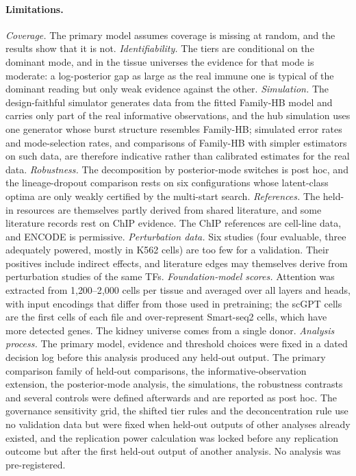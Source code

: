 \documentclass[11pt,a4paper]{article}
\begin{document}
\paragraph{Limitations.}
\emph{Coverage.} The primary model assumes coverage is missing at random, and the results show that it is not.
\emph{Identifiability.} The tiers are conditional on the dominant mode, and in the tissue universes the evidence for that mode is moderate: a log-posterior gap as large as the real immune one is typical of the dominant reading but only weak evidence against the other.
\emph{Simulation.} The design-faithful simulator generates data from the fitted Family-HB model and carries only part of the real informative observations, and the hub simulation uses one generator whose burst structure resembles Family-HB; simulated error rates and mode-selection rates, and comparisons of Family-HB with simpler estimators on such data, are therefore indicative rather than calibrated estimates for the real data.
\emph{Robustness.} The decomposition by posterior-mode switches is post hoc, and the lineage-dropout comparison rests on six configurations whose latent-class optima are only weakly certified by the multi-start search.
\emph{References.} The held-in resources are themselves partly derived from shared literature, and some literature records rest on ChIP evidence. The ChIP references are cell-line data, and ENCODE is permissive.
\emph{Perturbation data.} Six studies (four evaluable, three adequately powered, mostly in K562 cells) are too few for a validation. Their positives include indirect effects, and literature edges may themselves derive from perturbation studies of the same TFs.
\emph{Foundation-model scores.} Attention was extracted from 1{,}200--2{,}000 cells per tissue and averaged over all layers and heads, with input encodings that differ from those used in pretraining; the scGPT cells are the first cells of each file and over-represent Smart-seq2 cells, which have more detected genes. The kidney universe comes from a single donor.
\emph{Analysis process.} The primary model, evidence and threshold choices were fixed in a dated decision log before this analysis produced any held-out output. The primary comparison family of held-out comparisons, the informative-observation extension, the posterior-mode analysis, the simulations, the robustness contrasts and several controls were defined afterwards and are reported as post hoc. The governance sensitivity grid, the shifted tier rules and the deconcentration rule use no validation data but were fixed when held-out outputs of other analyses already existed, and the replication power calculation was locked before any replication outcome but after the first held-out output of another analysis. No analysis was pre-registered.
\end{document}

